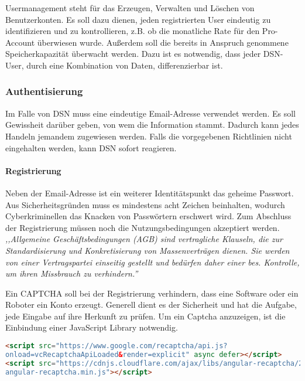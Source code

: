 
Usermanagement steht für das Erzeugen, Verwalten und Löschen von Benutzerkonten. Es soll dazu dienen, jeden registrierten User eindeutig zu identifizieren und zu kontrollieren, z.B. ob die monatliche Rate für den Pro-Account überwiesen wurde. Außerdem soll die bereits in Anspruch genommene Speicherkapazität überwacht werden. Dazu ist es notwendig, dass jeder DSN-User, durch eine Kombination von Daten, differenzierbar ist.
\subsubsection{Authentisierung}
Im Falle von DSN muss eine eindeutige Email-Adresse verwendet werden. Es soll Gewissheit darüber geben, von wem die Information stammt. Dadurch kann jedes Handeln jemandem zugewiesen werden. Falls die vorgegebenen Richtlinien nicht eingehalten werden, kann DSN sofort reagieren.
\paragraph{Registrierung}
Neben der Email-Adresse ist ein weiterer Identitätspunkt das geheime Passwort. Aus Sicherheitsgründen muss es mindestens acht Zeichen beinhalten, wodurch Cyberkriminellen das Knacken von Passwörtern erschwert wird. Zum Abschluss der Registrierung müssen noch die Nutzungsbedingungen akzeptiert werden.\\
\textit{,,Allgemeine Geschäftsbedingungen (AGB) sind vertragliche Klauseln, die zur Standardisierung und Konkretisierung von Massenverträgen dienen. Sie werden von einer Vertragspartei einseitig gestellt und bedürfen daher einer bes. Kontrolle, um ihren Missbrauch zu verhindern.''}\cite{AGB}\\
\cite{VERTEILTE_SYSTEME,PASSWORT_SCHUTZ}


\newpage

Ein \gls{CAPTCHA} soll bei der Registrierung verhindern, dass eine Software oder ein Roboter ein Konto erzeugt. Generell dient es der Sicherheit und hat die Aufgabe, jede Eingabe auf ihre Herkunft zu prüfen. Um ein Captcha anzuzeigen, ist die Einbindung einer JavaScript Library notwendig. \cite{CAPTCHA}
\begin{lstlisting}[caption={Einbindung der JS-Library Recaptcha}, language=HTML]
<script src="https://www.google.com/recaptcha/api.js?
onload=vcRecaptchaApiLoaded&render=explicit" async defer></script>
<script src="https://cdnjs.cloudflare.com/ajax/libs/angular-recaptcha/2.2.5/
angular-recaptcha.min.js"></script>
\end{lstlisting}

